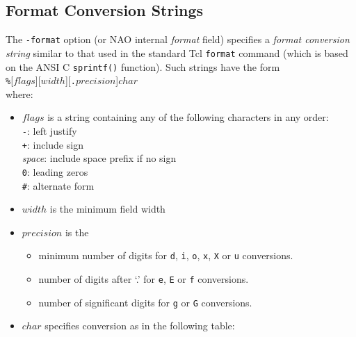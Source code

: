 \subsection{Format Conversion Strings}
    \label{ooc-data-format-strings}

The 
  \texttt{-format} option (or NAO internal 
  \emph{format} field) specifies a 
  \emph{format conversion string} similar to that used in the standard
  Tcl 
  \texttt{format} command (which is based on the ANSI C 
  \texttt{sprintf()} function). Such strings have the form
  \\
  \texttt{\%}[$flags$][$width$][\texttt{.}$precision$]$char$
  \\where:
  \begin{itemize}
    \item 
    $flags$ is a string containing any of the following
    characters in any order:
    \\
    \texttt{-}: left justify
    \\
    \texttt{+}: include sign
    \\
    \emph{space}: include space prefix if no sign
    \\
    \texttt{0}: leading zeros
    \\
    \texttt{\#}: alternate form
    \item 
    $width$ is the minimum field width
    \item 
    $precision$ is the
    \begin{itemize}
      \item minimum number of digits for 
      \texttt{d}, 
      \texttt{i}, 
      \texttt{o}, 
      \texttt{x}, 
      \texttt{X} or 
      \texttt{u} conversions.
      \item number of digits after `.' for 
      \texttt{e}, 
      \texttt{E} or 
      \texttt{f} conversions.
      \item number of significant digits for 
      \texttt{g} or 
      \texttt{G} conversions.
    \end{itemize}
    \item 
    $char$ specifies conversion as in the following table:


\end{itemize}
